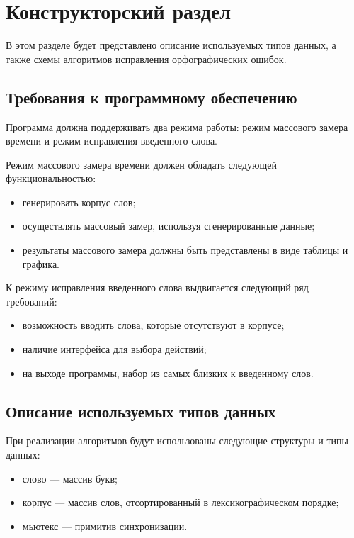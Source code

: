 \chapter{Конструкторский раздел}

В этом разделе будет представлено описание используемых типов данных, а также схемы алгоритмов исправления орфографических ошибок.

\section{Требования к программному обеспечению}

Программа должна поддерживать два режима работы: режим массового замера времени и режим исправления введенного слова.

Режим массового замера времени должен обладать следующей функциональностью:
\begin{itemize}
	\item генерировать корпус слов;
	\item осуществлять массовый замер, используя сгенерированные данные;
	\item результаты массового замера должны быть представлены в виде таблицы и графика.
\end{itemize}

К режиму исправления введенного слова выдвигается следующий ряд требований:
\begin{itemize}
	\item возможность вводить слова, которые отсутствуют в корпусе;
	\item наличие интерфейса для выбора действий;
	\item на выходе программы, набор из самых близких к введенному слов.
\end{itemize}

\section{Описание используемых типов данных}

При реализации алгоритмов будут использованы следующие структуры
и типы данных:
\begin{itemize}
	\item слово --- массив букв;
	\item корпус --- массив слов, отсортированный в лексикографическом порядке;
	\item мьютекс --- примитив синхронизации.
\end{itemize}


